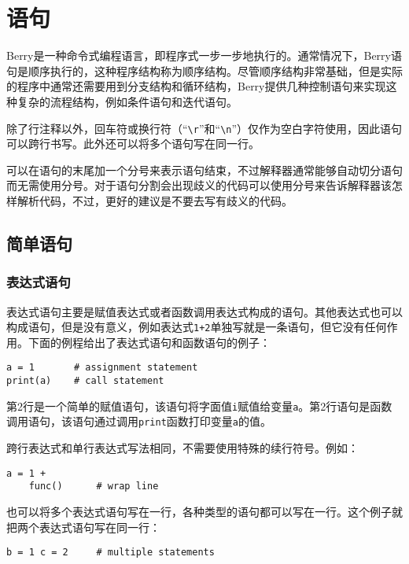 \chapter{语句}

Berry是一种命令式编程语言，即程序式一步一步地执行的。通常情况下，Berry语句是顺序执行的，这种程序结构称为顺序结构。尽管顺序结构非常基础，但是实际的程序中通常还需要用到分支结构和循环结构，Berry提供几种控制语句来实现这种复杂的流程结构，例如条件语句和迭代语句。

除了行注释以外，回车符或换行符（``\texttt{\textbackslash r}''和``\texttt{\textbackslash n}''）仅作为空白字符使用，因此语句可以跨行书写。此外还可以将多个语句写在同一行。

可以在语句的末尾加一个分号来表示语句结束，不过解释器通常能够自动切分语句而无需使用分号。对于语句分割会出现歧义的代码可以使用分号来告诉解释器该怎样解析代码，不过，更好的建议是不要去写有歧义的代码。

\section{简单语句}

\subsection{表达式语句}

表达式语句主要是赋值表达式或者函数调用表达式构成的语句。其他表达式也可以构成语句，但是没有意义，例如表达式\texttt{1+2}单独写就是一条语句，但它没有任何作用。下面的例程给出了表达式语句和函数语句的例子：
\begin{lstlisting}[language=berry, numbers=none]
a = 1       # assignment statement
print(a)    # call statement
\end{lstlisting}
第2行是一个简单的赋值语句，该语句将字面值\texttt{i}赋值给变量\texttt{a}。第2行语句是函数调用语句，该语句通过调用\texttt{print}函数打印变量\texttt{a}的值。

跨行表达式和单行表达式写法相同，不需要使用特殊的续行符号。例如：
\begin{lstlisting}[language=berry, numbers=none]
a = 1 +
    func()      # wrap line
\end{lstlisting}
也可以将多个表达式语句写在一行，各种类型的语句都可以写在一行。这个例子就把两个表达式语句写在同一行：
\begin{lstlisting}[language=berry, numbers=none]
b = 1 c = 2     # multiple statements
\end{lstlisting}

